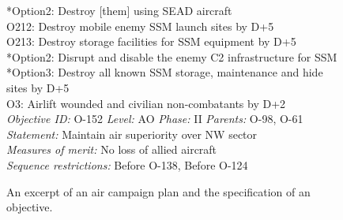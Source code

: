 \begin{figure}[tb]
\begin{scriptsize}
\begin{center}
\begin{minipage}{3.5in}
\hspace*{2ex}\hspace*{2ex}\hspace*{2ex}\hspace*{2ex}                     	*Option2: Destroy [them] using SEAD aircraft\\
\hspace*{2ex}\hspace*{2ex}              O212: Destroy mobile enemy SSM launch sites by D+5\\
\hspace*{2ex}\hspace*{2ex}              O213: Destroy storage facilities for SSM equipment by D+5\\
\hspace*{2ex}  *Option2: Disrupt and disable the enemy C2 infrastructure for SSM \\
\hspace*{2ex}  *Option3: Destroy all known SSM storage, maintenance and hide sites by D+5\\
O3: Airlift wounded and civilian non-combatants by D+2\\

{\em Objective ID:} O-152    {\em Level:} AO    {\em Phase:} II    {\em Parents:} O-98, O-61\\
{\em Statement:} Maintain air superiority over NW sector\\
{\em Measures of merit:} No loss of allied aircraft\\
{\em Sequence restrictions:} Before O-138, Before O-124\\
\end{minipage}
\end{center}
\end{scriptsize}
\caption{An excerpt of an air campaign plan and the specification of an objective.}
\label{acp}
\end{figure}

